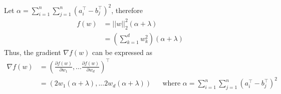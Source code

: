 \documentclass[11pt]{article}
\begin{document}
Let $\alpha = \sum_{i=1}^{n}\sum_{j=1}^{n} (a_i^\top - b_j^\top)^2$, therefore \\
\begin{align*}
f(w) & = ||w||_2^2 (\alpha + \lambda) \\
& = (\sum_{k=1}^{d} w_k^2)(\alpha + \lambda)
\end{align*}
Thus, the gradient $\nabla f(w)$ can be expressed as
\begin{align*}
\nabla f(w) & = (\frac{\partial f(w)}{\partial w_1}, ... \frac{\partial f(w)}{\partial w_d})^\top \\
& = (2w_1(\alpha + \lambda), ... 2w_d (\alpha + \lambda)) && \text{where } \alpha = \sum_{i=1}^{n}\sum_{j=1}^{n} (a_i^\top - b_j^\top)^2
\end{align*}
\end{document}
